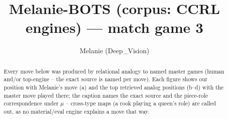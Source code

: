\documentclass[11pt]{article}
\title{Melanie-BOTS (corpus: CCRL engines) — match game 3}
\author{Melanie (Deep\_Vision)}
\date{}
\begin{document}
\maketitle

\begin{abstract}Every move below was produced by relational analogy to named master games (human and/or top-engine -- the exact source is named per move). Each figure shows our position with Melanie's move (a) and the top retrieved analog positions (b--d) with the master move played there; the caption names the exact source and the piece-role correspondence under $\mu$ -- cross-type maps (a rook playing a queen's role) are called out, as no material/eval engine explains a move that way.\end{abstract}

\begin{figure}[p]\centering
\begin{subfigure}{0.46\textwidth}\centering
\resizebox{\linewidth}{!}{%
\newchessgame
\chessboard[
  setfen={r2qk2r/1bp2ppp/pbnp1n2/1p2p1N1/3PP3/1BP5/PP3PPP/RNBQR1K1 b kq - 2 10},
  showmover=false,
  pgfstyle=straightmove, color=movearrow, markmove={e8-g8}
]}
\caption{}
\end{subfigure}\hfill
\begin{subfigure}{0.46\textwidth}\centering
\resizebox{\linewidth}{!}{%
\newchessgame
\chessboard[
  setfen={rn1qk2r/pbppb1pp/1p2pn2/3P1p2/2PN4/P1N5/1P2PPPP/R1BQKB1R b KQkq - 4 7},
  showmover=false,
  pgfstyle=straightmove, color=movearrow, markmove={e8-g8}
]}
\caption{}
\end{subfigure}
\\[4pt]
\begin{subfigure}{0.46\textwidth}\centering
\resizebox{\linewidth}{!}{%
\newchessgame
\chessboard[
  setfen={rnbq1rk1/pp3ppp/2p2n2/2bpp3/4P3/2NP1NP1/PPP2PBP/R1BQK2R w KQ - 1 7},
  showmover=false,
  pgfstyle=straightmove, color=movearrow, markmove={e1-g1}
]}
\caption{}
\end{subfigure}\hfill
\begin{subfigure}{0.46\textwidth}\centering
\resizebox{\linewidth}{!}{%
\newchessgame
\chessboard[
  setfen={r1bqk2r/pp3pbp/2nppnp1/2p3N1/2B1P3/2PP4/PP3PPP/RNBQR1K1 b kq - 3 8},
  showmover=false,
  pgfstyle=straightmove, color=movearrow, markmove={e8-g8}
]}
\caption{}
\end{subfigure}

\end{figure}
\end{document}

